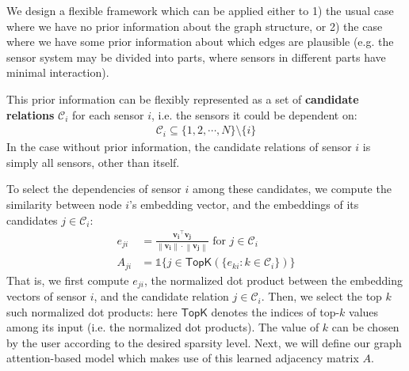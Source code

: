 \documentclass[letterpaper]{article} %
\begin{document}
We design a flexible framework which can be applied either to 1) the usual case where we have no prior information about the graph structure, or 2) the case where we have some prior information about which edges are plausible (e.g. the sensor system may be divided into parts, where sensors in different parts have minimal interaction). 

This prior information can be flexibly represented as a set of \textbf{candidate relations} $\mathcal{C}_i$ for each sensor $i$, i.e. the sensors it could be dependent on:
\begin{align}
    \mathcal{C}_i \subseteq \{1, 2, \cdots, N\} \setminus \{i\}
\end{align}
In the case without prior information, the candidate relations of sensor $i$ is simply all sensors, other than itself.



To select the dependencies of sensor $i$ among these candidates, we compute the similarity between node $i$'s embedding vector, and the embeddings of its candidates $j \in \mathcal{C}_i$:
\begin{align}
    e_{ji}  & = \frac{\mathbf{v_i}^\top \mathbf{v_j}}{\left\|\mathbf{v_i}\right\| \cdot \left\|\mathbf{v_j}\right\|} \text{ for }j \in \mathcal{C}_i\\ 
    A_{ji}  & = \mathds{1}\{ j \in \mathsf{TopK}(\{e_{ki}: k \in \mathcal{C}_i\}) \}
\end{align}
That is, we first compute $e_{ji}$, the normalized dot product between the embedding vectors of sensor $i$, and the candidate relation $j \in \mathcal{C}_i$. Then, we select the top $k$ such normalized dot products: here $\mathsf{TopK}$ denotes the indices of top-$k$ values among its input (i.e. the normalized dot products). The value of $k$ can be chosen by the user according to the desired sparsity level. Next, we will define our graph attention-based model which makes use of this learned adjacency matrix $A$.
\end{document}
